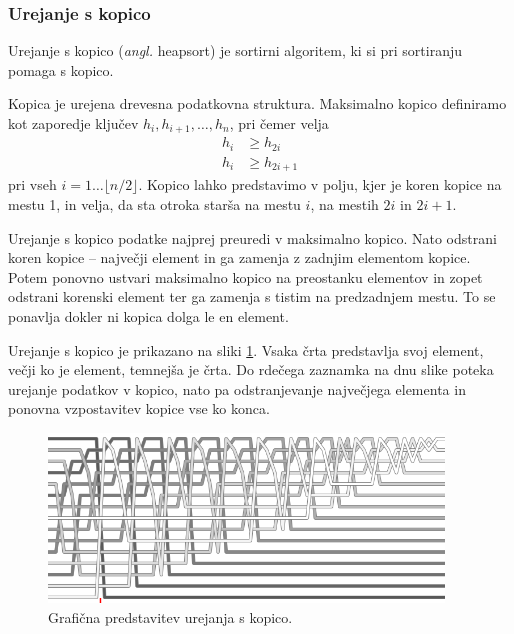 \documentclass[a4paper,oneside]{article}
\begin{document}
\subsubsection{Urejanje s kopico}
\label{chapter:heapsort}
Urejanje s kopico (\emph{angl.} heapsort) je sortirni algoritem,
ki si pri sortiranju pomaga s kopico.
\newline

Kopica je urejena drevesna podatkovna struktura.
Maksimalno kopico definiramo kot zaporedje ključev $h_i, h_{i+1}, \ldots, h_n$, pri čemer
velja
\begin{align*}
  h_i &\geq h_{2i} \\
  h_i &\geq h_{2i+1}
\end{align*}
pri vseh $i = 1 \ldots \lfloor n/2 \rfloor$. %
Kopico lahko predstavimo v polju, kjer je koren kopice na mestu 1, in velja, da sta otroka
starša na mestu $i$, na mestih $2i$ in $2i + 1$.

Urejanje s kopico podatke najprej preuredi v maksimalno kopico. Nato odstrani koren kopice
-- največji element in ga zamenja z zadnjim elementom kopice. Potem ponovno ustvari
maksimalno kopico na preostanku elementov in zopet odstrani korenski element ter ga
zamenja s tistim na predzadnjem mestu. To se ponavlja dokler ni kopica dolga le en
element. 

Urejanje s kopico je prikazano na sliki \ref{fig:heapsortimage}.
Vsaka črta predstavlja svoj element, večji ko je element, temnejša je črta.
Do rdečega zaznamka na dnu slike poteka urejanje podatkov v kopico, nato pa odstranjevanje
največjega elementa in ponovna vzpostavitev kopice vse ko konca.
\begin{figure}[h]
    \begin{center}
        \includegraphics[height=45mm]{slike/Heap.png}
    \end{center}
    \vspace{-0.7cm}
    \caption{Grafična predstavitev urejanja s kopico.}
    \label{fig:heapsortimage}
\end{figure}
\end{document}
